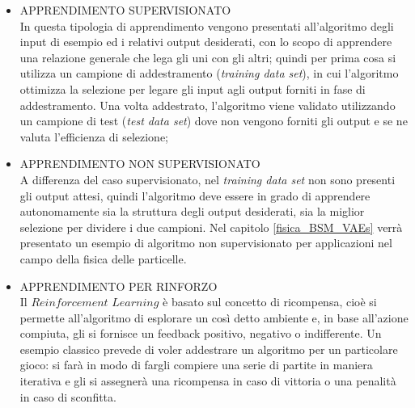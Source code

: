 \begin{itemize}
	
	\item APPRENDIMENTO SUPERVISIONATO \\
	In questa tipologia di apprendimento vengono presentati all'algoritmo degli input di esempio ed i relativi output desiderati, con lo scopo di apprendere una relazione generale che lega gli uni con gli altri; quindi per prima cosa si utilizza un campione di addestramento (\textit{training data set}), in cui l'algoritmo ottimizza la selezione per legare gli input agli output forniti in fase di addestramento. Una volta addestrato, l'algoritmo viene validato utilizzando un campione di test (\textit{test data set}) dove non vengono forniti gli output e se ne valuta l'efficienza di selezione;
	
	\item APPRENDIMENTO NON SUPERVISIONATO \\
	A differenza del caso supervisionato, nel \textit{training data set} non sono presenti gli output attesi, quindi l'algoritmo deve essere in grado di apprendere autonomamente sia la struttura degli output desiderati, sia la miglior selezione per dividere i due campioni.
	Nel capitolo \ref{fisica_BSM_VAEs} verrà presentato un esempio di algoritmo non supervisionato per applicazioni nel campo della fisica delle particelle.
	
	\item APPRENDIMENTO PER RINFORZO \\
	Il $\textit{Reinforcement Learning}$ è basato sul concetto di ricompensa, cioè si permette all'algoritmo di esplorare un così detto ambiente e, in base all'azione compiuta, gli si fornisce un feedback positivo, negativo o indifferente. Un esempio classico prevede di voler addestrare un algoritmo per un particolare gioco: si farà in modo di fargli compiere una serie di partite in maniera iterativa e gli si assegnerà una ricompensa in caso di vittoria o una penalità in caso di sconfitta. \\ 
\end{itemize}

\newpage

